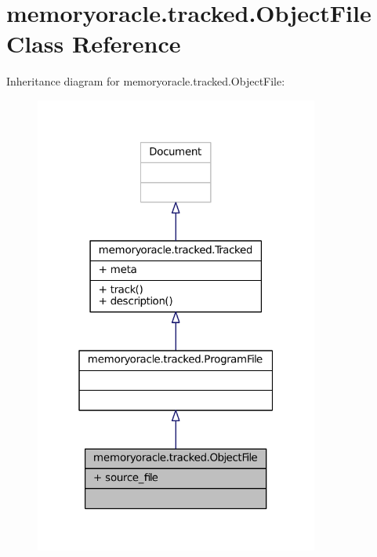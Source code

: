 \hypertarget{classmemoryoracle_1_1tracked_1_1ObjectFile}{}\section{memoryoracle.\+tracked.\+Object\+File Class Reference}
\label{classmemoryoracle_1_1tracked_1_1ObjectFile}


Inheritance diagram for memoryoracle.\+tracked.\+Object\+File\+:
\nopagebreak
\begin{figure}[H]
\begin{center}
\leavevmode
\includegraphics[width=265pt]{classmemoryoracle_1_1tracked_1_1ObjectFile__inherit__graph}
\end{center}
\end{figure}


